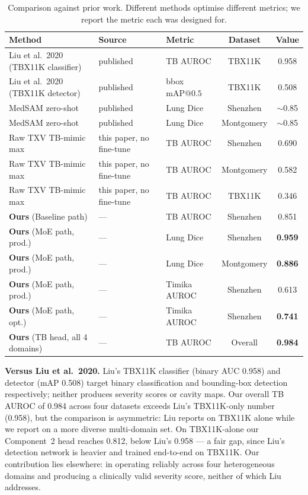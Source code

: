 \documentclass{article}
\begin{document}
\begin{table}[t]
\caption{Comparison against prior work. Different methods optimise different metrics; we report the metric each was designed for.}
\label{tab:sota}
\vskip 0.1in
\centering
\small
\begin{tabular}{lllcc}
\toprule
Method & Source & Metric & Dataset & Value \\
\midrule
Liu et al.\ 2020 (TBX11K classifier) & published \cite{liu2020tbx11k} & TB AUROC & TBX11K & 0.958 \\
Liu et al.\ 2020 (TBX11K detector) & published \cite{liu2020tbx11k} & bbox $\text{mAP}@0.5$ & TBX11K & 0.508 \\
MedSAM zero-shot \cite{ma2024medsam} & published & Lung Dice & Shenzhen & $\sim$0.85 \\
MedSAM zero-shot \cite{ma2024medsam} & published & Lung Dice & Montgomery & $\sim$0.85 \\
Raw TXV \cite{cohen2022torchxrayvision} TB-mimic max & this paper, no fine-tune & TB AUROC & Shenzhen & 0.690 \\
Raw TXV \cite{cohen2022torchxrayvision} TB-mimic max & this paper, no fine-tune & TB AUROC & Montgomery & 0.582 \\
Raw TXV \cite{cohen2022torchxrayvision} TB-mimic max & this paper, no fine-tune & TB AUROC & TBX11K & 0.346 \\
\midrule
\textbf{Ours} (Baseline path) & --- & TB AUROC & Shenzhen & 0.851 \\
\textbf{Ours} (MoE path, prod.) & --- & Lung Dice & Shenzhen & \textbf{0.959} \\
\textbf{Ours} (MoE path, prod.) & --- & Lung Dice & Montgomery & \textbf{0.886} \\
\textbf{Ours} (MoE path, prod.) & --- & Timika AUROC & Shenzhen & 0.613 \\
\textbf{Ours} (MoE path, opt.) & --- & Timika AUROC & Shenzhen & \textbf{0.741} \\
\textbf{Ours} (TB head, all 4 domains) & --- & TB AUROC & Overall & \textbf{0.984} \\
\bottomrule
\end{tabular}
\end{table}

\textbf{Versus Liu et al.\ 2020.} Liu's TBX11K classifier (binary AUC 0.958) and detector (mAP 0.508) target binary classification and bounding-box detection respectively; neither produces severity scores or cavity maps. Our overall TB AUROC of 0.984 across four datasets exceeds Liu's TBX11K-only number (0.958), but the comparison is asymmetric: Liu reports on TBX11K alone while we report on a more diverse multi-domain set. On TBX11K-alone our Component~2 head reaches 0.812, below Liu's 0.958 --- a fair gap, since Liu's detection network is heavier and trained end-to-end on TBX11K. Our contribution lies elsewhere: in operating reliably across four heterogeneous domains and producing a clinically valid severity score, neither of which Liu addresses.
\end{document}
